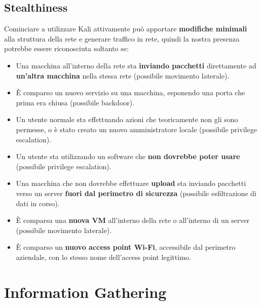 \documentclass{article}
\begin{document}
\subsection{Stealthiness}
Cominciare a utilizzare Kali attivamente può apportare \textbf{modifiche minimali} alla struttura della rete e generare traffico in rete, quindi la nostra presenza potrebbe essere riconosciuta soltanto se:
\begin{itemize}
    \item Una macchina all’interno della rete sta \textbf{inviando pacchetti} direttamente ad \textbf{un’altra macchina} nella stessa rete (possibile movimento laterale).

    \item È comparso un nuovo servizio su una macchina, esponendo una porta che prima era chiusa (possibile backdoor).

    \item Un utente normale sta effettuando azioni che teoricamente non gli sono permesse, o è stato creato un nuovo amministratore locale (possibile privilege escalation).

    \item Un utente sta utilizzando un software che \textbf{non dovrebbe poter usare} (possibile privilege escalation).
    
    \item Una macchina che non dovrebbe effettuare \textbf{upload} sta inviando pacchetti verso un server \textbf{fuori dal perimetro di sicurezza} (possibile esfiltrazione di dati in corso).

    \item È comparsa una \textbf{nuova VM} all’interno della rete o all’interno di un server (possibile movimento laterale).

    \item È comparso un \textbf{nuovo access point Wi-Fi}, accessibile dal perimetro aziendale, con lo stesso nome dell’access point legittimo.
\end{itemize}

\newpage

\section{Information Gathering}
\end{document}
